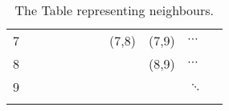 \begin{table}[!htb]
\begin{tabular}{lllllllllll}
		7 &                               &                               &                               &                               &                               &                               & \cellcolor[HTML]{9B9B9B}(7,8) & \cellcolor[HTML]{C0C0C0}(7,9) & \cellcolor[HTML]{C0C0C0}$\cdots$ &  \\
		8 &                               &                               &                               &                               &                               &                               &                               & \cellcolor[HTML]{C0C0C0}(8,9) & \cellcolor[HTML]{C0C0C0}$\cdots$ &  \\
		9 &                               &                               &                               &                               &                               &                               &                               &                               & $\ddots$                         &  \\
		&                               &                               &                               &                               &                               &                               &                               &                               &                                  & 
	\end{tabular}
	\caption{The Table representing neighbours.}
	\label{tab:neighbours}
\end{table}